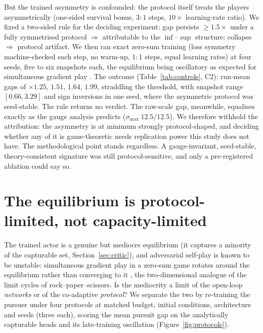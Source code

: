 \documentclass[twoside,11pt]{article}
\begin{document}
But the trained asymmetry is confounded: the protocol itself treats
the players asymmetrically (one-sided survival bonus, $3\!:\!1$ steps,
$10\times$ learning-rate ratio).  We fixed a two-sided rule for the
deciding experiment: gap persists $\ge 1.5\times$ under a fully
symmetrised protocol $\Rightarrow$ attributable to the $\inf$--$\sup$
structure; collapse $\Rightarrow$ protocol artifact.  We then ran
exact zero-sum training (loss symmetry machine-checked each step, no
warm-up, $1\!:\!1$ steps, equal learning rates) at four seeds, five to
six snapshots each, the equilibrium being oscillatory as expected for
simultaneous gradient play \citep{mescheder2018gan,
daskalakis2018training}.  The outcome (Table~\ref{tab:controls}, C2):
run-mean gaps of $\times 1.25$, $1.51$, $1.64$, $1.99$, straddling the
threshold, with snapshot range $[0.66, 3.29]$ and sign inversions in
one seed, where the asymmetric protocol was seed-stable.  The rule
returns no verdict.  The raw-scale gap, meanwhile, equalises exactly
as the gauge analysis predicts ($\sigma_{\max}\ 12.5/12.5$).  We
therefore withhold the attribution: the asymmetry is at minimum
strongly protocol-shaped, and deciding whether any of it is
game-theoretic needs replication power this study does not have.  The
methodological point stands regardless.  A gauge-invariant,
seed-stable, theory-consistent signature was still protocol-sensitive,
and only a pre-registered ablation could say so.

\section{The equilibrium is protocol-limited, not capacity-limited}
\label{sec:coadapt}

The trained actor is a genuine but mediocre equilibrium (it captures a
minority of the capturable set, Section~\ref{sec:critic}), and
adversarial self-play is known to be unstable: simultaneous gradient
play in a zero-sum game rotates around the equilibrium rather than
converging to it \citep{mescheder2018gan, daskalakis2018training}, the
two-dimensional analogue of the limit cycles of rock--paper--scissors.
Is the mediocrity a limit of the open-loop \emph{networks} or of the
co-adaptive \emph{protocol}?  We separate the two by re-training the
pursuer under four protocols at matched budget, initial conditions,
architecture and seeds (three each), scoring the mean pursuit gap on
the analytically capturable heads and its late-training oscillation
(Figure~\ref{fig:protocols}).
\end{document}
